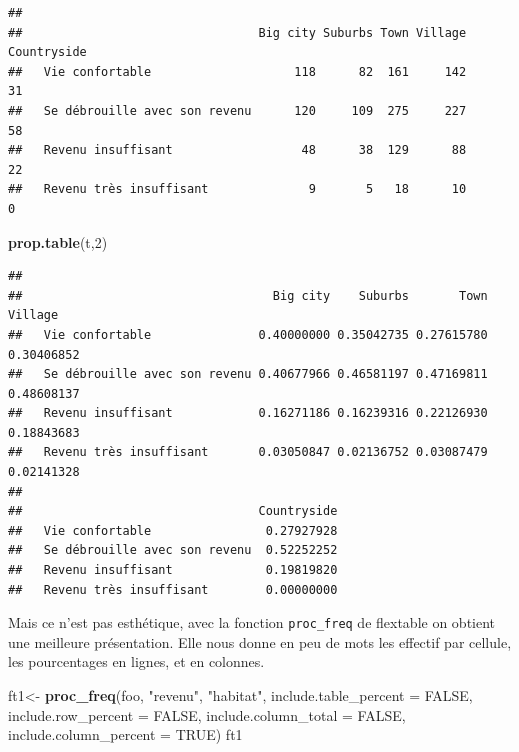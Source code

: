 \documentclass[
]{book}
\newenvironment{Shaded}{\begin{snugshade}}{\end{snugshade}}
\newcommand{\DataTypeTok}[1]{\textcolor[rgb]{0.13,0.29,0.53}{#1}}
\newcommand{\DecValTok}[1]{\textcolor[rgb]{0.00,0.00,0.81}{#1}}
\newcommand{\KeywordTok}[1]{\textcolor[rgb]{0.13,0.29,0.53}{\textbf{#1}}}
\newcommand{\NormalTok}[1]{#1}
\newcommand{\OperatorTok}[1]{\textcolor[rgb]{0.81,0.36,0.00}{\textbf{#1}}}
\newcommand{\OtherTok}[1]{\textcolor[rgb]{0.56,0.35,0.01}{#1}}
\newcommand{\StringTok}[1]{\textcolor[rgb]{0.31,0.60,0.02}{#1}}
\begin{document}
\begin{Shaded}
\end{Shaded}

\begin{verbatim}
##                                
##                                 Big city Suburbs Town Village Countryside
##   Vie confortable                    118      82  161     142          31
##   Se débrouille avec son revenu      120     109  275     227          58
##   Revenu insuffisant                  48      38  129      88          22
##   Revenu très insuffisant              9       5   18      10           0
\end{verbatim}

\begin{Shaded}
\begin{Highlighting}[]
\KeywordTok{prop.table}\NormalTok{(t,}\DecValTok{2}\NormalTok{)}
\end{Highlighting}
\end{Shaded}

\begin{verbatim}
##                                
##                                   Big city    Suburbs       Town    Village
##   Vie confortable               0.40000000 0.35042735 0.27615780 0.30406852
##   Se débrouille avec son revenu 0.40677966 0.46581197 0.47169811 0.48608137
##   Revenu insuffisant            0.16271186 0.16239316 0.22126930 0.18843683
##   Revenu très insuffisant       0.03050847 0.02136752 0.03087479 0.02141328
##                                
##                                 Countryside
##   Vie confortable                0.27927928
##   Se débrouille avec son revenu  0.52252252
##   Revenu insuffisant             0.19819820
##   Revenu très insuffisant        0.00000000
\end{verbatim}

Mais ce n'est pas esthétique, avec la fonction \texttt{proc\_freq} de flextable on obtient une meilleure présentation. Elle nous donne en peu de mots les effectif par cellule, les pourcentages en lignes, et en colonnes.

\begin{Shaded}
\begin{Highlighting}[]
\NormalTok{ft1<-}\StringTok{ }\KeywordTok{proc_freq}\NormalTok{(foo, }\StringTok{"revenu"}\NormalTok{, }\StringTok{"habitat"}\NormalTok{, }\DataTypeTok{include.table_percent =} \OtherTok{FALSE}\NormalTok{,}
                \DataTypeTok{include.row_percent =} \OtherTok{FALSE}\NormalTok{, }\DataTypeTok{include.column_total =} \OtherTok{FALSE}\NormalTok{,}
  \DataTypeTok{include.column_percent =} \OtherTok{TRUE}\NormalTok{)}
\NormalTok{ft1}
\end{Highlighting}
\end{Shaded}
\end{document}
